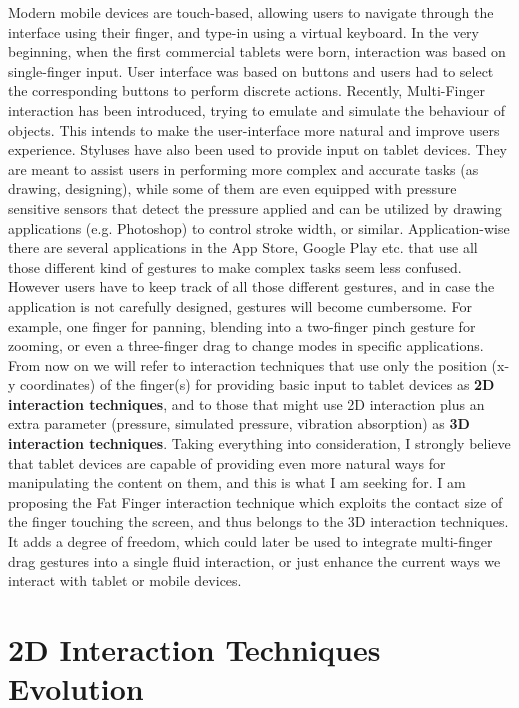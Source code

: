 Modern mobile devices are touch-based, allowing users to navigate through the interface using their finger, and type-in using a virtual keyboard. 
In the very beginning, when the first commercial tablets were born, interaction was based on single-finger input. User interface was based on buttons and users had to select the corresponding buttons to perform discrete actions.
Recently, Multi-Finger interaction has been introduced, trying to emulate and simulate the behaviour of objects. This intends to make the user-interface more natural and improve users experience. 
Styluses have also been used to provide input on tablet devices. They are meant to assist users in performing more complex and accurate tasks (as drawing, designing), while some of them are even equipped with pressure sensitive sensors that detect the pressure applied and can be utilized by drawing applications (e.g. Photoshop) to control stroke width, or similar. 
Application-wise there are several applications in the App Store, Google Play etc. that use all those different kind of gestures to make complex tasks seem less confused. However users have to keep track of all those different gestures, and in case the application is not carefully designed, gestures will become cumbersome. For example, one finger for panning, blending into a two-finger pinch gesture for zooming, or even a three-finger drag to change modes in specific applications.  
From now on we will refer to interaction techniques that use only the position (x-y coordinates) of the finger(s) for providing basic input to tablet devices as \textbf{2D interaction techniques}, and to those that might use 2D interaction plus an extra parameter (pressure, simulated pressure, vibration absorption) as \textbf{3D interaction techniques}.
Taking everything into consideration, I strongly believe that tablet devices are capable of providing even more natural ways for manipulating the content on them, and this is what I am seeking for. I am proposing the Fat Finger interaction technique which exploits the contact size of the finger touching the screen, and thus belongs to the 3D interaction techniques. It adds a degree of freedom, which could later be used to integrate multi-finger drag gestures into a single fluid interaction, or just enhance the current ways we interact with tablet or mobile devices. 


\section{2D Interaction Techniques Evolution}


